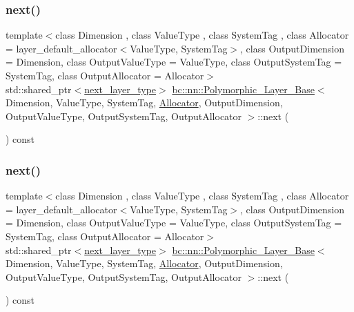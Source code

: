 \subsubsection{\texorpdfstring{next()}{next()}\hspace{0.1cm}{\footnotesize\ttfamily [3/4]}}
{\footnotesize\ttfamily template$<$class Dimension , class Value\+Type , class System\+Tag , class Allocator  = layer\+\_\+default\+\_\+allocator$<$\+Value\+Type, System\+Tag$>$, class Output\+Dimension  = Dimension, class Output\+Value\+Type  = Value\+Type, class Output\+System\+Tag  = System\+Tag, class Output\+Allocator  = Allocator$>$ \\
std\+::shared\+\_\+ptr$<$\hyperlink{structbc_1_1nn_1_1Polymorphic__Layer__Base_ac7d70db83e8370d2975d05401713f677}{next\+\_\+layer\+\_\+type}$>$ \hyperlink{structbc_1_1nn_1_1Polymorphic__Layer__Base}{bc\+::nn\+::\+Polymorphic\+\_\+\+Layer\+\_\+\+Base}$<$ Dimension, Value\+Type, System\+Tag, \hyperlink{classbc_1_1allocators_1_1Allocator}{Allocator}, Output\+Dimension, Output\+Value\+Type, Output\+System\+Tag, Output\+Allocator $>$\+::next (\begin{DoxyParamCaption}{ }\end{DoxyParamCaption}) const\hspace{0.3cm}{\ttfamily [inline]}}

\mbox{\label{structbc_1_1nn_1_1Polymorphic__Layer__Base_a042ca1b5f4e9c78fa9953e3f310972a5}} 
\subsubsection{\texorpdfstring{next()}{next()}\hspace{0.1cm}{\footnotesize\ttfamily [4/4]}}
{\footnotesize\ttfamily template$<$class Dimension , class Value\+Type , class System\+Tag , class Allocator  = layer\+\_\+default\+\_\+allocator$<$\+Value\+Type, System\+Tag$>$, class Output\+Dimension  = Dimension, class Output\+Value\+Type  = Value\+Type, class Output\+System\+Tag  = System\+Tag, class Output\+Allocator  = Allocator$>$ \\
std\+::shared\+\_\+ptr$<$\hyperlink{structbc_1_1nn_1_1Polymorphic__Layer__Base_ac7d70db83e8370d2975d05401713f677}{next\+\_\+layer\+\_\+type}$>$ \hyperlink{structbc_1_1nn_1_1Polymorphic__Layer__Base}{bc\+::nn\+::\+Polymorphic\+\_\+\+Layer\+\_\+\+Base}$<$ Dimension, Value\+Type, System\+Tag, \hyperlink{classbc_1_1allocators_1_1Allocator}{Allocator}, Output\+Dimension, Output\+Value\+Type, Output\+System\+Tag, Output\+Allocator $>$\+::next (\begin{DoxyParamCaption}{ }\end{DoxyParamCaption}) const\hspace{0.3cm}{\ttfamily [inline]}}

